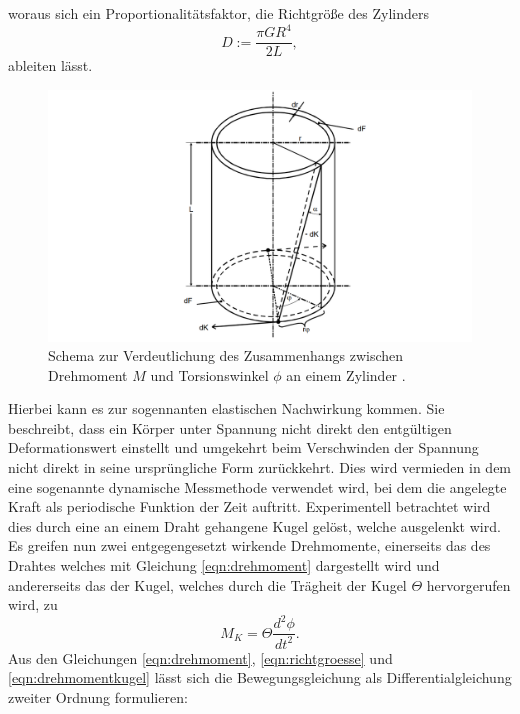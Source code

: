     woraus sich ein Proportionalitätsfaktor, die Richtgröße des Zylinders 
    \begin{equation}
    \label{eqn:richtgroesse}
    D := \frac{\pi G R^4}{2L},
    \end{equation}
    ableiten lässt.
    \begin{figure}
        \centering
        \includegraphics[width=\textwidth]{content/hohlzylinder.png}
        \caption{Schema zur Verdeutlichung des Zusammenhangs zwischen Drehmoment $M$ und Torsionswinkel $\phi$ an einem Zylinder \cite[97]{V102}.}
        \label{fig:Hohlzylinder}
    \end{figure}
    Hierbei kann es zur sogennanten elastischen Nachwirkung kommen.
    Sie beschreibt, dass ein Körper unter Spannung nicht direkt den entgültigen Deformationswert einstellt und umgekehrt beim 
    Verschwinden der Spannung nicht direkt in seine ursprüngliche Form zurückkehrt. Dies wird vermieden in dem eine sogenannte 
    dynamische Messmethode verwendet wird, bei dem die angelegte Kraft als periodische Funktion der Zeit auftritt.
    Experimentell betrachtet wird dies durch eine an einem Draht gehangene Kugel gelöst, welche ausgelenkt wird. Es greifen
    nun zwei entgegengesetzt wirkende Drehmomente, einerseits das des Drahtes welches mit Gleichung \eqref{eqn:drehmoment} dargestellt wird
    und andererseits das der Kugel, welches durch die Trägheit der Kugel $\Theta$ hervorgerufen wird, zu 
    \begin{equation}
    \label{eqn:drehmomentkugel}
    M_K = \Theta \frac{d^2\phi}{dt^2}.
    \end{equation}
    Aus den Gleichungen \eqref{eqn:drehmoment}, \eqref{eqn:richtgroesse} und \eqref{eqn:drehmomentkugel} lässt sich die Bewegungsgleichung
    als Differentialgleichung zweiter Ordnung formulieren:
